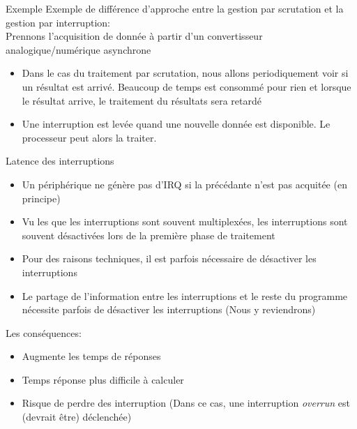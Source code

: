 \begin{frame}{Exemple}
  Exemple de différence d'approche entre la gestion par scrutation et 
  la gestion par interruption:\\

  Prennons  l'acquisition  de   donnée  à  partir  d'un  convertisseur
  analogique/numérique asynchrone
  \begin{itemize}
  \item  Dans  le  cas  du  traitement  par  scrutation,  nous  allons
    periodiquement voir  si un résultat est arrivé.  Beaucoup de temps
    est  consommé  pour  rien   et  lorsque  le  résultat  arrive,  le
    traitement du résultats sera retardé
  \item  Une interruption  est  levée quand  une  nouvelle donnée  est
    disponible. Le processeur peut alors la traiter.
  \end{itemize}
\end{frame} 

\begin{frame}{Latence des interruptions}
  \begin{itemize} 
  \item Un périphérique ne génère pas d'IRQ si la précédante n'est pas
    acquitée (en principe)
  \item Vu  les que les  interruptions sont souvent  multiplexées, les
    interruptions sont  souvent désactivées lors de  la première phase
    de traitement
  \item  Pour des  raisons techniques,  il est  parfois  nécessaire de
    désactiver les interruptions
  \item  Le partage  de l'information  entre les  interruptions  et le
    reste   du   programme  nécessite   parfois   de  désactiver   les
    interruptions (Nous y reviendrons)
  \end{itemize} 
  Les conséquences:
  \begin{itemize} 
  \item Augmente les temps de réponses
  \item Temps réponse plus difficile à calculer
  \item  Risque   de  perdre  des  interruption  (Dans   ce  cas,  une
    interruption \emph{overrun} est (devrait être) déclenchée)
  \end{itemize} 
\end{frame} 

